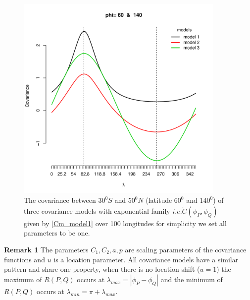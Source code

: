 	\begin{figure}[H]
		\centering
		\includegraphics[width=0.9\textwidth]{graphs/all_covariance_models}
		\caption[The covariance between $30^0S$ and $50^0N$ (latitude $60^0$ and $140^0$) of three covariance models] {The covariance between $30^0S$ and $50^0N$ (latitude $60^0$ and $140^0$) of three covariance models with exponential family $ i.e. \tilde{C}(\phi_P, \phi_Q)$ given by \ref{Cm_model1} over 100 longitudes  for simplicity we set all parameters to be one.}
	\end{figure}
	
	{\bf Remark 1} The parameters $C_1, C_2, a, p$ are scaling parameters of the covariance functions and $u$ is a location parameter. All covariance models have a similar pattern and share one property, when there is no location shift ($u = 1$) the maximum of $R(P,Q)$ occurs at $\lambda_{max} = |\phi_P -\phi_Q|$ and the minimum of $R(P,Q)$ occurs at $\lambda_{min} = \pi + \lambda_{max}$. 
		
